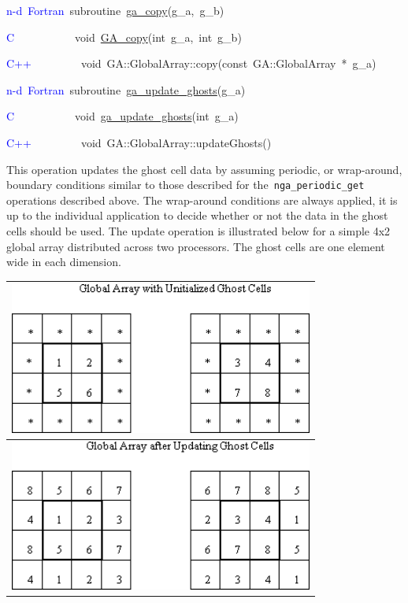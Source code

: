 \textcolor{blue}{n-d~Fortran}~subroutine~\href{https://hpc.pnl.gov/globalarrays/api/f_op_api.html\#ga_copy}{ga\_{}copy}(g\_a,~g\_b)~

\textcolor{blue}{C~}~~~~~~~~~~void~\href{https://hpc.pnl.gov/globalarrays/api/c_op_api.html\#ga_copy}{GA\_{}copy}(int~g\_a,~int~g\_b)~

\textcolor{blue}{C++}~~~~~~~~~void~GA::GlobalArray::copy(const~GA::GlobalArray~{*}~g\_a)

\textcolor{blue}{n-d~Fortran}~subroutine~\href{https://hpc.pnl.gov/globalarrays/api/f_op_api.html\#ga_update_ghosts}{ga\_{}update\_{}ghosts}(g\_a)~

\textcolor{blue}{C}~~~~~~~~~~~void~\href{https://hpc.pnl.gov/globalarrays/api/c_op_api.html\#ga_update_ghosts}{ga\_{}update\_{}ghosts}(int~g\_a)~

\textcolor{blue}{C++}~~~~~~~~~void~GA::GlobalArray::updateGhosts()~


This operation updates the ghost cell data by assuming periodic, or
wrap-around, boundary conditions similar to those described for the\texttt{
nga\_periodic\_get} operations described above. The wrap-around conditions
are always applied, it is up to the individual application to decide
whether or not the data in the ghost cells should be used. The update
operation is illustrated below for a simple 4x2 global array distributed
across two processors. The ghost cells are one element wide in each
dimension.

\begin{tabular}{|c|}
\hline 
\includegraphics[width=10cm]{ghost012}\tabularnewline
\hline
\hline 
\includegraphics[width=10cm]{ghost015}\tabularnewline
\hline
\end{tabular}

